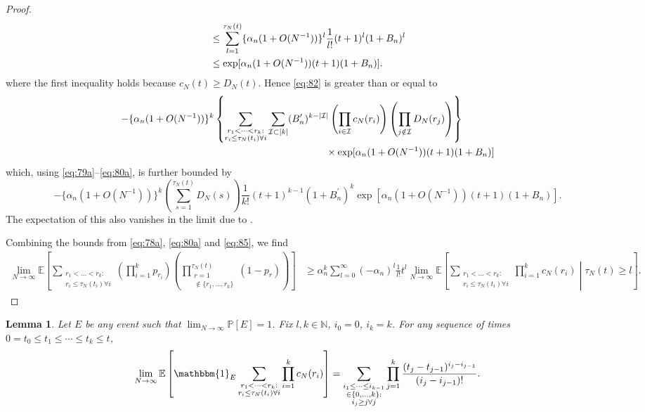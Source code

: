 \documentclass{article}
\newtheorem{lemma}{Lemma}
\newcommand{\Prob}{\mathbb{P}}
\newcommand{\E}{\mathbb{E}}
\newcommand{\1}[1]{\mathbbm{1}_{#1}}
\begin{document}
\begin{proof}
\begin{align}
&\leq \sum_{l=1}^{\tau_N(t)} \{ \alpha_n (1 + O(N^{-1}) ) \}^l \frac{1}{l!}
(t+1)^l (1+B_n)^l \notag\\
&\leq \exp[ \alpha_n (1 + O(N^{-1}) ) (t+1) (1+B_n) ].
\end{align}
where the first inequality holds because $c_N(t) \geq D_N(t)$.
Hence \eqref{eq:82} is greater than or equal to
\begin{align}
- \{ \alpha_n (1 + O(N^{-1}) ) \}^k
&\left\{ \sum_{\substack{r_1 <\dots< r_k :\\ r_i \leq \tau_N(t_i) \forall i}}
\sum_{\mathcal{I} \subset [k]} (B_n^\prime)^{k-|\mathcal{I}|}
\left( \prod_{i\in\mathcal{I}} c_N(r_i) \right)
\left( \prod_{j\notin\mathcal{I}} D_N(r_j) \right) \right\} \notag\\
&\hspace{4cm}\times \exp[ \alpha_n (1 + O(N^{-1}) ) (t+1) (1+B_n) ] 
\end{align}
which, using \eqref{eq:79a}--\eqref{eq:80a}, is further bounded by
\begin{equation}
- \{ \alpha_n (1 + O(N^{-1}) ) \}^k \left( \sum_{s=1}^{\tau_N(t)} D_N(s) \right) \frac{1}{k!} (t+1)^{k-1} (1 + B_n^\prime)^k 
\exp[ \alpha_n (1 + O(N^{-1}) ) (t+1) (1+B_n) ] . \label{eq:85}
\end{equation}
The expectation of this also vanishes in the limit due to \citet[Equation (3.4)]{brown2021}.

Combining the bounds from \eqref{eq:78a}, \eqref{eq:80a} and \eqref{eq:85}, we find
\begin{align}
\lim_{N\to\infty} \E \left[ \sum_{\substack{r_1 <\dots< r_k :\\ r_i \leq \tau_N(t_i) \forall i}}
\left( \prod_{i=1}^k p_{r_i} \right)
\left( \prod_{\substack{r=1 \\ \notin \{r_1,\dots,r_k\} }}^{\tau_N(t)} (1-p_r) \right) \right]
&\geq \alpha_n^k \sum_{l=0}^{\infty} (-\alpha_n)^l \frac{1}{l!} t^l 
\lim_{N\to\infty}\E \left[ \sum_{\substack{r_1 <\dots< r_k :\\ r_i \leq \tau_N(t_i) \forall i}} \prod_{i=1}^k c_N(r_i) \middle| \tau_N(t) \geq l \right] .
\end{align}
\end{proof}



\begin{lemma}\label{thm:LOterms_equality}
Let $E$ be any event such that $\lim_{N\to\infty} \Prob[E] =1$. Fix $l, k \in \mathbb{N}$, $i_0=0$, $i_k=k$. For any sequence of times $0 = t_0 \leq t_1 \leq \cdots \leq t_k \leq t$,
\begin{equation}\label{eq:88}
\lim_{N\to\infty} \E \left[ \1{E} \sum_{\substack{r_1<\dots<r_k :\\ r_i\leq \tau_N(t_i) \forall i}} \prod_{i=1}^k c_N(r_i) \right] 
= \sum_{\substack{i_1\leq \dots\leq i_{k-1}\\ \in \{0,\dots,k\} :\\ i_j \geq j \forall j}} \prod_{j=1}^k \frac{(t_j - t_{j-1})^{i_j - i_{j-1}}}{(i_j - i_{j-1})! } .
\end{equation}
\end{lemma}
\end{document}

